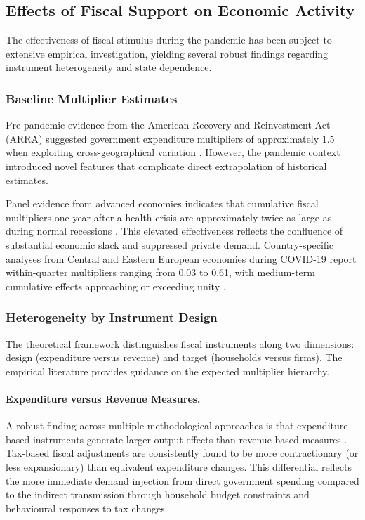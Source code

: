 \documentclass[12pt, a4paper]{article}
\begin{document}
\subsection{Effects of Fiscal Support on Economic Activity}
\label{subsec:fiscal_output}

The effectiveness of fiscal stimulus during the pandemic has been subject to extensive empirical investigation, yielding several robust findings regarding instrument heterogeneity and state dependence.

\subsubsection{Baseline Multiplier Estimates}

Pre-pandemic evidence from the American Recovery and Reinvestment Act (ARRA) suggested government expenditure multipliers of approximately 1.5 when exploiting cross-geographical variation \citep{ChodorowReich2019}. However, the pandemic context introduced novel features that complicate direct extrapolation of historical estimates.

Panel evidence from advanced economies indicates that cumulative fiscal multipliers one year after a health crisis are approximately twice as large as during normal recessions \citep{IMF2022}. This elevated effectiveness reflects the confluence of substantial economic slack and suppressed private demand. Country-specific analyses from Central and Eastern European economies during COVID-19 report within-quarter multipliers ranging from 0.03 to 0.61, with medium-term cumulative effects approaching or exceeding unity \citep{Haug2021}.

\subsubsection{Heterogeneity by Instrument Design}

The theoretical framework distinguishes fiscal instruments along two dimensions: design (expenditure versus revenue) and target (households versus firms). The empirical literature provides guidance on the expected multiplier hierarchy.

\paragraph{Expenditure versus Revenue Measures.}
A robust finding across multiple methodological approaches is that expenditure-based instruments generate larger output effects than revenue-based measures \citep{Blanchard2013, Ramey2019}. Tax-based fiscal adjustments are consistently found to be more contractionary (or less expansionary) than equivalent expenditure changes. This differential reflects the more immediate demand injection from direct government spending compared to the indirect transmission through household budget constraints and behavioural responses to tax changes.
\end{document}
